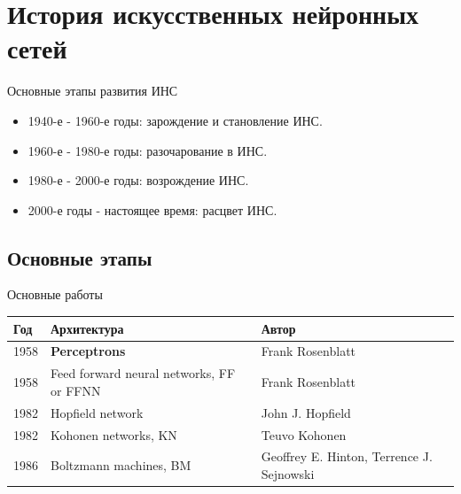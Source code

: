 \documentclass{beamer}
\begin{document}
\section{История искусственных нейронных сетей}
\begin{frame}{Основные этапы развития ИНС}




\begin{itemize}
\item 1940-е - 1960-е годы: зарождение и становление ИНС.
\item 1960-е - 1980-е годы: разочарование в ИНС.
\end{itemize}



\begin{itemize}
\item 1980-е - 2000-е годы: возрождение ИНС.
\item 2000-е годы - настоящее время: расцвет ИНС.
\end{itemize}


\end{frame}
\subsection{Основные этапы}

\begin{frame}{Основные работы}
\begin{center}
\begin{tabular}{|p{0.4in}|p{1.5in}|p{1.3in}|}\hline
\textbf{Год}& \textbf{Архитектура} & \textbf{Автор} \\
\hline
1958 & \textbf{Perceptrons} & Frank Rosenblatt \\\hline
1958 & \textsf{Feed forward neural networks, FF or FFNN} & Frank Rosenblatt \\\hline
1982 & \textsf{Hopfield network} & John J. Hopfield \\\hline
1982 & \textsf{Kohonen networks, KN} & Teuvo Kohonen \\\hline
1986 & \textsf{Boltzmann machines, BM} & Geoffrey E. Hinton, Terrence J. Sejnowski \\\hline
\end{tabular}
\end{center}
\end{frame}
\end{document}
